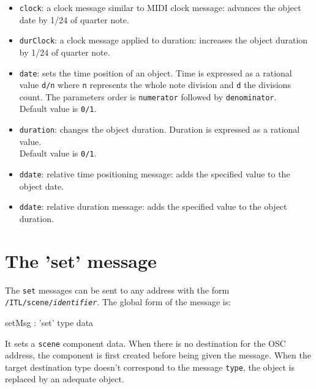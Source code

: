 \documentclass[a4paper,twoside]{report}
\newcommand{\toplevel}[1]	{\chapter{#1}}
\newcommand{\OSC}[1]		{\texttt{#1}}
\newcommand{\values}[1]	{\texttt{#1}}
\begin{document}
\begin{itemize}
\item \OSC{clock}: a clock message similar to MIDI clock message: advances the object date by 1/24 of quarter note.
\item \OSC{durClock}: a clock message applied to duration: increases the object duration by 1/24 of quarter note.
\item \OSC{date}: sets the time position of an object. Time is expressed as a rational value \values{d/n} where \values{n} represents the whole note division and \values{d} the divisions count. The parameters order is \values{numerator} followed by \values{denominator}.\\
Default value is \values{0/1}.
\item \OSC{duration}: changes the object duration. Duration is expressed as a rational value. \\
Default value is \values{0/1}.
\item \OSC{ddate}: relative time positioning message: adds the specified value to the object date.
\item \OSC{ddate}: relative duration message: adds the specified value to the object duration.
\end{itemize}


\toplevel{The 'set' message}
\label{setsect}
The \OSC{set} messages can be sent to any address with the form \OSC{/ITL/scene/\textit{identifier}}. The global form of the message is:

\begin{rail}
setMsg : 'set' type data
\end{rail}

It sets a \OSC{scene} component data. When there is no destination for the OSC address, the component is first created before being given the message. When the target destination type doesn't correspond to the message \OSC{type}, the object is replaced by an adequate object.
\end{document}
